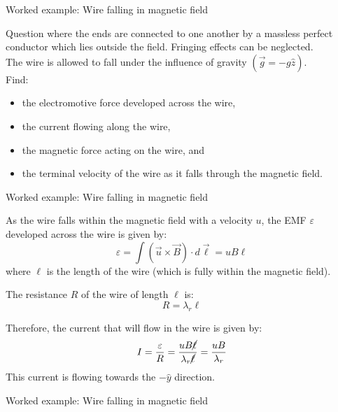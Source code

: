 {\begin{frame}{Worked example: Wire falling in magnetic field}
\begin{blockexmplque}{Question}
    where the ends are connected to one another by a massless perfect conductor
    which lies outside the field. Fringing effects can be neglected.\\
    The wire is allowed to fall under the influence of gravity $(\vec{g} = -g \hat{z})$.\\
    Find:
    \begin{itemize}
    \item the electromotive force developed across the wire,
    \item the current flowing along the wire,
    \item the magnetic force acting on the wire, and
    \item the terminal velocity of the wire as it falls through the magnetic field.
    \end{itemize}
  \end{blockexmplque}

\end{frame}

%
%
%

\begin{frame}{Worked example: Wire falling in magnetic field}

  As the wire falls within the magnetic field with a velocity $u$,
  the EMF $\varepsilon$ developed across the wire is given by:
  \begin{equation*}
    \varepsilon = \int (\vec{u} \times \vec{B}) \cdot d\vec{\ell}
                = uB\ell
  \end{equation*}
  where $\ell$ is the length of the wire
  (which is fully within the magnetic field).

  The resistance $R$ of the wire of length $\ell$ is:
  \begin{equation*}
    R = \lambda_{r} \ell
  \end{equation*}

  Therefore, the current that will flow in the wire is given by:
  \begin{equation*}
    I = \frac{\varepsilon}{R}
      = \frac{uB\cancel{\ell}}{\lambda_{r}\cancel{\ell}}
      = \frac{uB}{\lambda_{r}}
  \end{equation*}
  This current is flowing towards the $-\hat{y}$ direction.

\end{frame}

%
%
%

\begin{frame}{Worked example: Wire falling in magnetic field}


\end{frame}}
